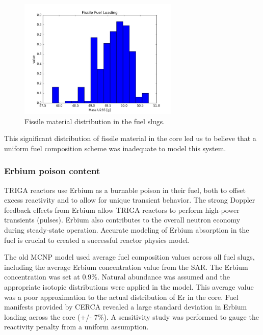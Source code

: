 \documentclass{UWNR_modeling}
\begin{document}
\begin{figure}[H]
  \centering
  \includegraphics[width=3in]{mass235.jpeg}
  \caption{Fissile material distribution in the fuel slugs.}
  \label{fig:235_dist}
\end{figure}

\noindent
This significant distribution of fissile material in the core led us to believe that a uniform fuel composition scheme was inadequate to model this system.



\subsubsection{Erbium poison content}

TRIGA reactors use Erbium as a burnable poison in their fuel, both to offset excess reactivity and to allow for unique transient behavior\cite{NRAD}. The strong Doppler feedback effects from Erbium allow TRIGA reactors to perform high-power transients (pulses). Erbium also contributes to the overall neutron economy during steady-state operation. Accurate modeling of Erbium absorption in the fuel is crucial to created a successful reactor physics model.

The old MCNP model used average fuel composition values across all fuel slugs, including the average Erbium concentration value from the SAR. The Erbium concentration was set at 0.9\%. Natural abundance was assumed and the appropriate isotopic distributions were applied in the model. This average value was a poor approximation to the actual distribution of Er in the core. Fuel manifests provided by CERCA revealed a large standard deviation in Erbium loading across the core (+/- 7\%). A sensitivity study was performed to gauge the reactivity penalty from a uniform assumption. 
\end{document}
